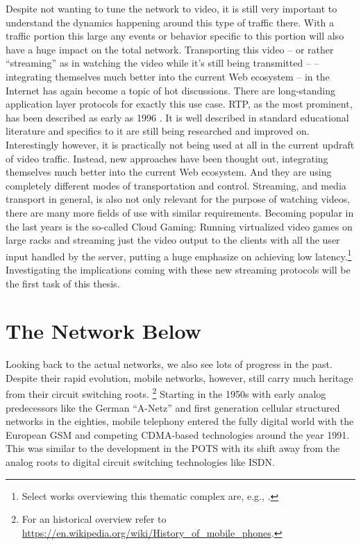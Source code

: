 Despite not wanting to tune the network to video, it is still very important to understand the dynamics happening around this type of traffic there. With a traffic portion this large any events or behavior specific to this portion will also have a huge impact on the total network.
Transporting this video -- or rather ``streaming'' as in watching the video while it's still being transmitted -- -- integrating themselves much better into the current Web ecosystem --  in the Internet has again become a topic of hot discussions. There are long-standing application layer protocols for exactly this use case. \gls{RTP}, as the most prominent, has been described as early as 1996 \cite{rfc1889}. It is well described in standard educational literature and specifics to it are still being researched and improved on. Interestingly however, it is practically not being used at all in the current updraft of video traffic. 
Instead, new approaches have been thought out, integrating themselves much better into the current Web ecosystem.
And they are using completely different modes of transportation and control. Streaming, and media transport in general, is also not only relevant for the purpose of watching videos, there are many more fields of use with similar requirements. Becoming popular in the last years is the so-called Cloud Gaming: Running virtualized video games on large racks and streaming just the video output to the clients with all the user input handled by the server, putting a huge emphasize on achieving low latency.\footnote{Select works overviewing this thematic complex are, e.g., \cite{4795441,wang2009modeling,jarschel2011cloudevaluation,ct2010wolken}.}
Investigating the implications coming with these new streaming protocols will be the first task of this thesis.

\section{The Network Below}

Looking back to the actual networks, we also see lots of progress in the past. Despite their rapid evolution, mobile networks, however, still carry much heritage from their circuit switching roots. \footnote{For an historical overview refer to \url{https://en.wikipedia.org/wiki/History_of_mobile_phones}. }
Starting in the 1950s with early analog predecessors like the German ``A-Netz'' and first generation cellular structured networks in the eighties, mobile telephony entered the fully digital world with the European \gls{GSM} and competing \gls{CDMA}-based technologies around the year 1991. This was similar to the development in the \gls{POTS} with its shift away from the analog roots to digital circuit switching technologies like \gls{ISDN}.

